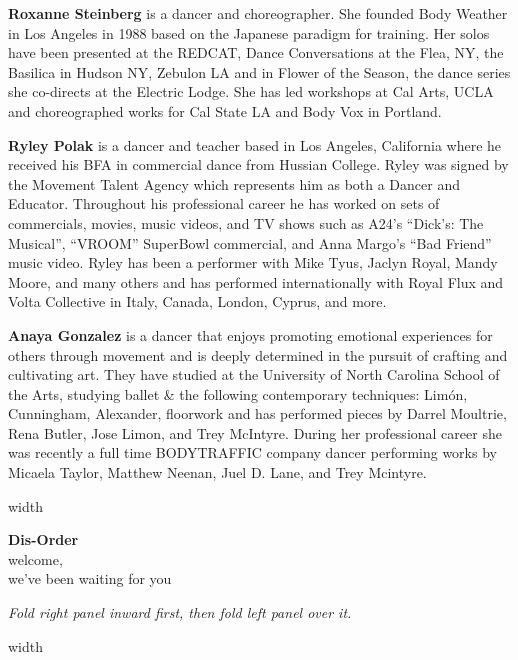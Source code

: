 \documentclass[10pt,letterpaper,landscape]{article}
\newlength{\foldsep}
\newlength{\foldrulewidth}
\newlength{\panelwidth}
\newlength{\panelheight}
\newcommand{\foldrule}{\hspace{\foldsep}\vrule width \foldrulewidth\hspace{\foldsep}}
\newcommand{\panel}[1]{%
  \begin{minipage}[t][\panelheight][t]{\panelwidth}%
    \raggedright #1%
  \end{minipage}%
}
\newcommand{\panellabel}[1]{}
\newcommand{\biosize}{\fontsize{5.65}{6.35}\selectfont}
\newcommand{\copysize}{\fontsize{7.05}{7.95}\selectfont}
\begin{document}
\copysize
\noindent
\panel{
  \panellabel{Back Panel}
  \biosize
  \textbf{Roxanne Steinberg} is a dancer and choreographer. She founded Body Weather in Los Angeles in 1988 based on the Japanese paradigm for training. Her solos have been presented at the REDCAT, Dance Conversations at the Flea, NY, the Basilica in Hudson NY, Zebulon LA and in Flower of the Season, the dance series she co-directs at the Electric Lodge. She has led workshops at Cal Arts, UCLA and choreographed works for Cal State LA and Body Vox in Portland.

  \textbf{Ryley Polak} is a dancer and teacher based in Los Angeles, California where he received his BFA in commercial dance from Hussian College. Ryley was signed by the Movement Talent Agency which represents him as both a Dancer and Educator. Throughout his professional career he has worked on sets of commercials, movies, music videos, and TV shows such as A24's ``Dick's: The Musical'', ``VROOM'' SuperBowl commercial, and Anna Margo's ``Bad Friend'' music video. Ryley has been a performer with Mike Tyus, Jaclyn Royal, Mandy Moore, and many others and has performed internationally with Royal Flux and Volta Collective in Italy, Canada, London, Cyprus, and more.

  \textbf{Anaya Gonzalez} is a dancer that enjoys promoting emotional experiences for others through movement and is deeply determined in the pursuit of crafting and cultivating art. They have studied at the University of North Carolina School of the Arts, studying ballet \& the following contemporary techniques: Limón, Cunningham, Alexander, floorwork and has performed pieces by Darrel Moultrie, Rena Butler, Jose Limon, and Trey McIntyre. During her professional career she was recently a full time BODYTRAFFIC company dancer performing works by Micaela Taylor, Matthew Neenan, Juel D. Lane, and Trey Mcintyre.
}
\foldrule
\panel{
  \panellabel{Front Cover}
  \vspace*{1.55in}
  \begin{center}
    {\fontsize{31}{34}\selectfont\textbf{Dis-Order}}\\[1.1em]
    {\fontsize{14}{16}\selectfont welcome,}\\[0.35em]
    {\fontsize{14}{16}\selectfont we've been waiting for you}
  \end{center}

  \vfill
  {\fontsize{5.4}{6.1}\selectfont\textit{Fold right panel inward first, then fold left panel over it.}}
}
\foldrule
\end{document}
